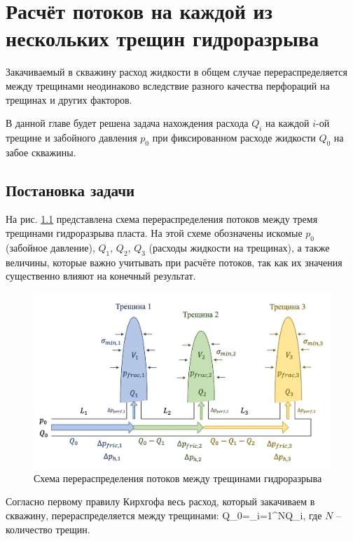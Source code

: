 \chapter{Расчёт потоков на каждой из нескольких трещин гидроразрыва} \label{ch3}

Закачиваемый в скважину расход жидкости в общем случае перераспределяется между трещинами неодинаково вследствие разного качества перфораций на трещинах и других факторов.

В данной главе будет решена задача нахождения расхода $Q_i$ на каждой $i$-ой трещине и забойного давления $p_0$ при фиксированном расходе жидкости $Q_0$ на забое скважины.

\section{Постановка задачи}
\vspace*{-5mm}

На рис. \ref{fig:flow_distribution_scheme} представлена схема перераспределения потоков между тремя трещинами гидроразрыва пласта.
На этой схеме обозначены искомые $p_0$ (забойное давление), $Q_1$, $Q_2$, $Q_3$ (расходы жидкости на трещинах), а также величины, которые важно учитывать при расчёте потоков, так как их значения существенно влияют на конечный результат.

\begin{figure}[H] 
\center
\includegraphics[width=\linewidth]{images/flow_distribution_scheme.jpg}
\caption{Схема перераспределения потоков между трещинами гидроразрыва} 
\label{fig:flow_distribution_scheme}  
\end{figure}

Согласно первому правилу Кирхгофа весь расход, который закачиваем в скважину, перераспределяется между трещинами:
\beq\label{3_1}
Q_0=\sum\limits_{i=1}^{N}Q_i,
\eeq
где $N$ -- количество трещин.

